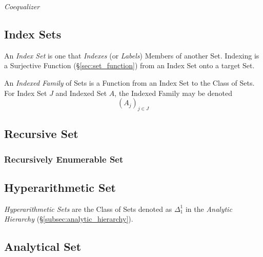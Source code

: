 \documentclass{article}
\begin{document}
\emph{Coequalizer}



\subsection{Index Sets}\label{subsec:index_set}

An \emph{Index Set} is one that \emph{Indexes} (or \emph{Labels})
Members of another Set. Indexing is a Surjective Function
(\S\ref{sec:set_function}) from an Index Set onto a target Set.

An \emph{Indexed Family} of Sets is a Function from an Index Set to
the Class of Sets. For Index Set $J$ and Indexed Set $A$, the Indexed
Family may be denoted
\[
    (A_j)_{j \in J}
\]



\subsection{Recursive Set}\label{subsec:recursive_set}

\subsubsection{Recursively Enumerable Set}\label{subsec:recursively_enumerable}

\subsection{Hyperarithmetic Set}\label{subsec:hyperarithmetic_set}

\emph{Hyperarithmetic Sets} are the Class of Sets denoted as
$\Delta^1_1$ in the \emph{Analytic Hierarchy}
(\S\ref{subsec:analytic_hierarchy}).



\subsection{Analytical Set}\label{subsec:analytical_set}
\end{document}
